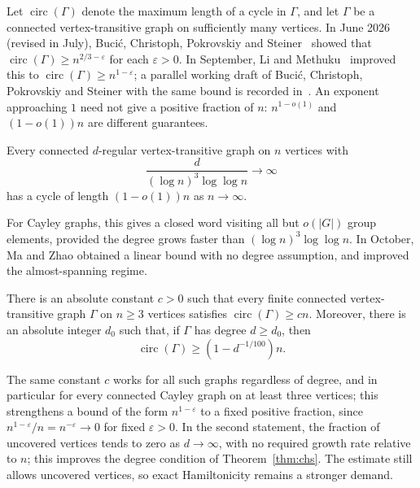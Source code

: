 Let $\operatorname{circ}(\Gamma)$ denote the maximum length of a cycle in $\Gamma$, and let $\Gamma$ be a connected vertex-transitive graph on sufficiently many vertices. In June 2026 (revised in July), Buci\'c, Christoph, Pokrovskiy and Steiner~\cite{bcps26} showed that $\operatorname{circ}(\Gamma)\geq n^{2/3-\varepsilon}$ for each $\varepsilon>0$. In September, Li and Methuku~\cite{lm26} improved this to $\operatorname{circ}(\Gamma)\geq n^{1-\varepsilon}$; a parallel working draft of Buci\'c, Christoph, Pokrovskiy and Steiner with the same bound is recorded in~\cite[\S1]{mz26}. An exponent approaching $1$ need not give a positive fraction of $n$: $n^{1-o(1)}$ and $(1-o(1))n$ are different guarantees.

\begin{theorem}\label{thm:chs}
Every connected $d$-regular vertex-transitive graph on $n$ vertices with
\[
\frac{d}{(\log n)^3\log\log n}\longrightarrow\infty
\]
has a cycle of length $(1-o(1))n$ as $n\to\infty$.
\end{theorem}

For Cayley graphs, this gives a closed word visiting all but $o(|G|)$ group elements, provided the degree grows faster than $(\log n)^3\log\log n$. In October, Ma and Zhao obtained a linear bound with no degree assumption, and improved the almost-spanning regime.

\begin{theorem}\label{thm:mz}
There is an absolute constant $c>0$ such that every finite connected vertex-transitive graph $\Gamma$ on $n\geq3$ vertices satisfies $\operatorname{circ}(\Gamma)\geq cn$. Moreover, there is an absolute integer $d_0$ such that, if $\Gamma$ has degree $d\geq d_0$, then
\[
\operatorname{circ}(\Gamma)\geq(1-d^{-1/100})n .
\]
\end{theorem}

The same constant $c$ works for all such graphs regardless of degree, and in particular for every connected Cayley graph on at least three vertices; this strengthens a bound of the form $n^{1-\varepsilon}$ to a fixed positive fraction, since $n^{1-\varepsilon}/n=n^{-\varepsilon}\to0$ for fixed $\varepsilon>0$. In the second statement, the fraction of uncovered vertices tends to zero as $d\to\infty$, with no required growth rate relative to $n$; this improves the degree condition of Theorem~\ref{thm:chs}. The estimate still allows uncovered vertices, so exact Hamiltonicity remains a stronger demand.

